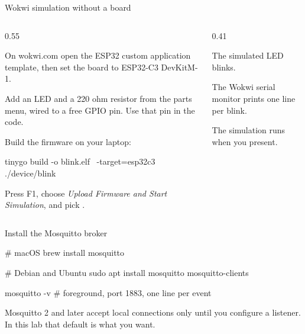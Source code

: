 \documentclass[10pt,aspectratio=169,t]{beamer}
\begin{document}
\begin{frame}[fragile,embedded,eyebrow=Task III]{Wokwi simulation without a board}
  \begin{columns}[T]
    \begin{column}{0.55\textwidth}
      \begin{steps}
        \item On wokwi.com open the ESP32 custom application template, then set the board to ESP32-C3 DevKitM-1.
        \item Add an LED and a 220 ohm resistor from the parts menu, wired to a free GPIO pin. Use that pin in the code.
        \item Build the firmware on your laptop:
\begin{shell}
tinygo build -o blink.elf \
  -target=esp32c3 ./device/blink
\end{shell}
        \item Press F1, choose \emph{Upload Firmware and Start Simulation}, and pick .
      \end{steps}
    \end{column}
    \begin{column}{0.41\textwidth}
      \begin{checklist}
        \item The simulated LED blinks.
        \item The Wokwi serial monitor prints one line per blink.
        \item The simulation runs when you present.
      \end{checklist}
    \end{column}
  \end{columns}
\end{frame}

\begin{frame}[fragile,eyebrow=Setup]{Install the Mosquitto broker}
\begin{shell}
# macOS
brew install mosquitto

# Debian and Ubuntu
sudo apt install mosquitto mosquitto-clients

mosquitto -v         # foreground, port 1883, one line per event
\end{shell}
  \begin{hint}
    Mosquitto 2 and later accept local connections only until you configure a listener. In this lab that default is what you want.
  \end{hint}
\end{frame}
\end{document}
